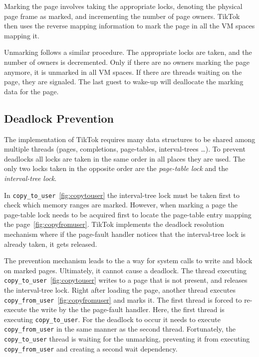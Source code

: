 \documentclass[conference]{IEEEtran}
\newcommand{\sysname}{TikTok}
\begin{document}
Marking the page involves taking the appropriate locks, denoting the physical
page frame as marked, and incrementing the number of page owners. \sysname{} then
uses the reverse mapping information to mark the page in all the VM spaces
mapping it.

Unmarking follows a similar procedure. The appropriate locks are taken, and the
number of owners is decremented. Only if there are no owners marking the page
anymore, it is unmarked in all VM spaces. If there are threads waiting on the
page, they are signaled. The last guest to wake-up will deallocate the marking
data for the page.

\subsection{Deadlock Prevention}
\label{subsec:deadlockprevention}
The implementation of \sysname{} requires many data structures to be shared
among multiple threads (pages, completions, page-tables, interval-trees \ldots).
To prevent deadlocks all locks are taken in the same order in all places they
are used. The only two locks taken in the opposite order are the
\emph{page-table lock} and the \emph{interval-tree lock}.

In \texttt{copy\_to\_user}~\autoref{fig:copytouser} the interval-tree lock must
be taken first to check which memory ranges are marked. However, when marking a
page the page-table lock needs to be acquired first to locate the page-table
entry mapping the page~\autoref{fig:copyfromuser}. \sysname{} implements the
deadlock resolution mechanism where if the page-fault handler notices that the
interval-tree lock is already taken, it gets released.

The prevention mechanism leads to the a way for system calls to write and block
on marked pages. Ultimately, it cannot cause a deadlock. The thread executing
\texttt{copy\_to\_user}~\autoref{fig:copytouser} writes to a page that is not
present, and releases the interval-tree lock. Right after loading the page,
another thread executes \texttt{copy\_from\_user}~\autoref{fig:copyfromuser} and
marks it. The first thread is forced to re-execute the write by the the
page-fault handler. Here, the first thread is executing \texttt{copy\_to\_user}.
For the deadlock to occur it needs to execute \texttt{copy\_from\_user} in the
same manner as the second thread. Fortunately, the \texttt{copy\_to\_user}
thread is waiting for the unmarking, preventing it from executing
\texttt{copy\_from\_user} and creating a second wait dependency.
\end{document}
